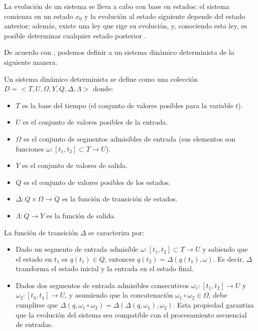 La evolución de un sistema se lleva a cabo con base en estados: el sistema comienza en un estado $x_0$ y la evolución al estado siguiente depende del estado anterior; además, existe una ley que rige su evolución, y, conociendo esta ley, es posible determinar cualquier estado posterior \cite{sis_din}.

De acuerdo con \cite{modelado_sis_det}, podemos definir a un sistema dinámico determinista de la siguiente manera.

\begin{definition}
	
	Un sistema dinámico determinista se define como una colección $D = <T, U, \Omega, Y, Q, \Delta, \varLambda>$ donde: 
	
	\begin{itemize}
		
		\item $T$ es la base del tiempo (el conjunto de valores posibles para la variable $t$).
		
		\item $U$ es el conjunto de valores posibles de la entrada.
		
		\item $\Omega$ es el conjunto de segmentos admisibles de entrada (sus elementos son funciones $\omega : [t_1, t_2] \subset T \to U$).
		
		\item $Y$ es el conjunto de valores de salida.
		
		\item $Q$ es el conjunto de valores posibles de los estados.
		
		\item $\Delta: Q \times \Omega \to Q$ es la función de transición de estados.
		
		\item $\varLambda: Q \to Y$ es la función de salida.
		
	\end{itemize}
	
\end{definition}

La función de transición $\Delta$ se caracteriza por:

\begin{itemize}
	
	\item Dado un segmento de entrada admisible $\omega: [t_1, t_2] \subset T \to U$ y sabiendo que el estado en $t_1$ es $q(t_1) \in Q$, entonces $q(t_2) = \Delta(q(t_1),\omega)$. Es decir, $\Delta$ transforma el estado inicial y la entrada en el estado final. 
	
	\item Dados dos segmentos de entrada admisibles consecutivos $\omega_1: [t_1, t_2] \to U$ y $\omega_2:[t_3, t_4] \to U$, y asumiendo que la concatenación $\omega_1 \circ \omega_2 \in \Omega$, debe cumplirse que $\Delta(q, \omega_1 \circ \omega_2) = \Delta(\Delta(q, \omega_1), \omega_2)$. Esta propiedad garantiza que la evolución del sistema sea compatible con el procesamiento secuencial de entradas.
	
\end{itemize}


